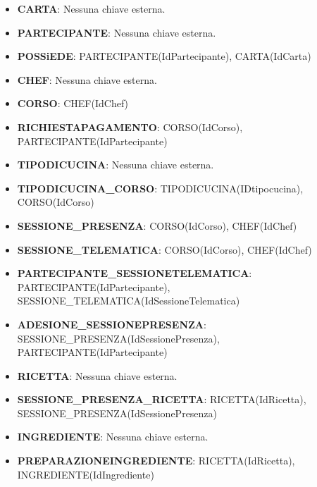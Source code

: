\begin{itemize}
    \item \textbf{CARTA}: Nessuna chiave esterna.
    \item \textbf{PARTECIPANTE}: Nessuna chiave esterna.
    \item \textbf{POSSiEDE}:  \textrightarrow{} PARTECIPANTE(IdPartecipante),  \textrightarrow{} CARTA(IdCarta)
    \item \textbf{CHEF}: Nessuna chiave esterna.
    \item \textbf{CORSO}:  \textrightarrow{} CHEF(IdChef)
    \item \textbf{RICHIESTAPAGAMENTO}:  \textrightarrow{} CORSO(IdCorso),  \textrightarrow{} PARTECIPANTE(IdPartecipante)
    \item \textbf{TIPODICUCINA}: Nessuna chiave esterna.
    \item \textbf{TIPODICUCINA\_CORSO}:  \textrightarrow{} TIPODICUCINA(IDtipocucina),  \textrightarrow{} CORSO(IdCorso)
    \item \textbf{SESSIONE\_PRESENZA}:  \textrightarrow{} CORSO(IdCorso),  \textrightarrow{} CHEF(IdChef)
    \item \textbf{SESSIONE\_TELEMATICA}:  \textrightarrow{} CORSO(IdCorso),  \textrightarrow{} CHEF(IdChef)
    \item \textbf{PARTECIPANTE\_SESSIONETELEMATICA}:  \textrightarrow{} PARTECIPANTE(IdPartecipante),  \textrightarrow{} SESSIONE\_TELEMATICA(IdSessioneTelematica)
    \item \textbf{ADESIONE\_SESSIONEPRESENZA}:  \textrightarrow{} SESSIONE\_PRESENZA(IdSessionePresenza),  \textrightarrow{} PARTECIPANTE(IdPartecipante)
    \item \textbf{RICETTA}: Nessuna chiave esterna.
    \item \textbf{SESSIONE\_PRESENZA\_RICETTA}:  \textrightarrow{} RICETTA(IdRicetta),  \textrightarrow{} SESSIONE\_PRESENZA(IdSessionePresenza)
    \item \textbf{INGREDIENTE}: Nessuna chiave esterna.
    \item \textbf{PREPARAZIONEINGREDIENTE}:  \textrightarrow{} RICETTA(IdRicetta),  \textrightarrow{} INGREDIENTE(IdIngrediente)
\end{itemize}

